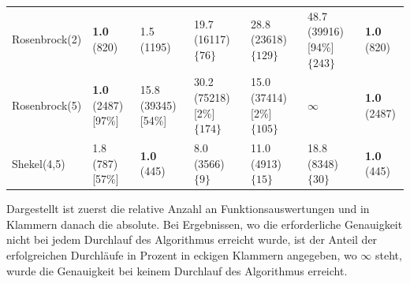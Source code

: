 \documentclass[fontsize=12, a4aper]{scrartcl}
\begin{document}
\begin{table}[H]
\begin{tabularx}{\linewidth}{l X X X X X X}
			Rosenbrock(2) & \textbf{1.0} (820) & 1.5 (1195) & 19.7 (16117) \(\{76\}\) & 28.8 (23618) \(\{129\}\) & 48.7 (39916) [94\%] \(\{243\}\) & \textbf{1.0} (820)\\
			
			Rosenbrock(5) & \textbf{1.0} (2487) [97\%] & 15.8 (39345) [54\%] & 30.2 (75218) [2\%] \(\{174\}\) & 15.0 (37414) [2\%] \(\{105\}\) & \(\infty\) & \textbf{1.0} (2487)\\
			
			Shekel(4,5) & 1.8 (787) [57\%] & \textbf{1.0} (445) & 8.0 (3566) \(\{9\}\) & 11.0 (4913) \(\{15\}\) & 18.8 (8348) \(\{30\}\) & \textbf{1.0} (445)\\
			
			\bottomrule
			
		\end{tabularx}
		
		\smallskip
		
		Dargestellt ist zuerst die relative Anzahl an Funktionsauswertungen und in Klammern danach die absolute. Bei Ergebnissen, wo die erforderliche Genauigkeit nicht bei jedem Durchlauf des Algorithmus erreicht wurde, ist der Anteil der erfolgreichen Durchläufe in Prozent in eckigen Klammern angegeben, wo \(\infty\) steht, wurde die Genauigkeit bei keinem Durchlauf des Algorithmus erreicht.\hfill\newline
		
	\end{table}
	
\end{document}
